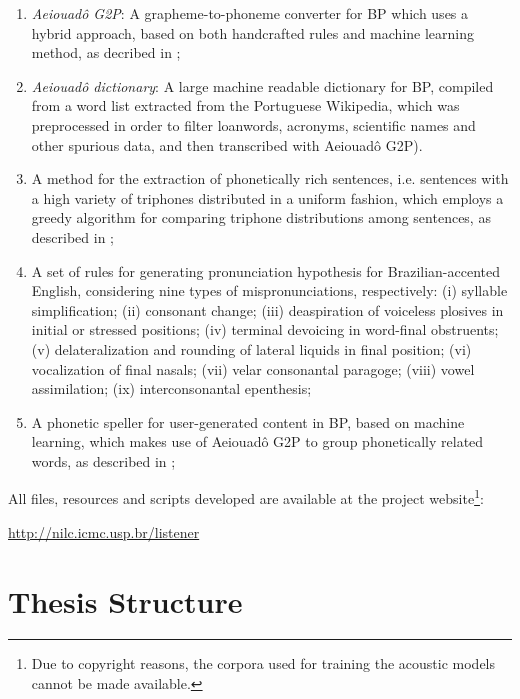 \begin{enumerate}
 \item \emph{Aeiouad\^o G2P}: A grapheme-to-phoneme converter for \ac{BP} which uses a hybrid approach, based on both handcrafted rules and machine learning method, as decribed in \citeauthor{Mendonca2014} \cite{Mendonca2014};
 \item \emph{Aeiouad\^o dictionary}: A large machine readable dictionary for \ac{BP}, compiled from a word list extracted from the Portuguese Wikipedia, which was preprocessed in order to filter loanwords, acronyms, scientific names and other spurious data, and then transcribed with Aeiouad\^o G2P).
 \item A method for the extraction of phonetically rich sentences, i.e. sentences with a high variety of triphones distributed in a uniform fashion, which employs a greedy algorithm for comparing triphone distributions among sentences, as described in \citeauthor{Mendonca2014b} \cite{Mendonca2014b};
 \item A set of rules for generating pronunciation hypothesis for Brazilian-accented English, considering nine types of mispronunciations, respectively: (i) syllable simplification; (ii) consonant change; (iii) deaspiration of voiceless plosives in initial or stressed positions; (iv) terminal devoicing in word-final obstruents; (v) delateralization and rounding of lateral liquids in final position; (vi) vocalization of final nasals; (vii) velar consonantal paragoge; (viii) vowel assimilation; (ix) interconsonantal epenthesis;
 \item A phonetic speller for user-generated content in \ac{BP}, based on machine learning, which makes use of Aeiouad\^o G2P to group phonetically related words, as described in \citeauthor{Mendonca2015} \cite{Mendonca2015};
\end{enumerate}

All files, resources and scripts developed are available at the project website\footnote{Due to copyright reasons, the corpora used for training the acoustic models cannot be made available.}: 
\begin{center}
 \url{http://nilc.icmc.usp.br/listener}
\end{center}

\section{Thesis Structure}

